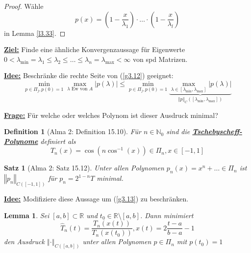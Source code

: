\documentclass{book}
\newtheorem{theorem}[algorithm]{Satz}
\newtheorem{lemma}[algorithm]{Lemma}
\newtheorem{definition}[algorithm]{Definition}
\def\R{\mathbb{R}}
\def\N{\mathbb{N}}
\begin{document}
            \begin{proof}
                Wähle
                \begin{equation*}
                    p(x)=\left(1-\frac{x}{\lambda_1}\right)\cdot \dots \cdot \left(1-\frac{x}{\lambda_l}\right)
                \end{equation*}
                in Lemma \ref{l3.33}.
            \end{proof}

            \underline{\textbf{Ziel:}} Finde eine ähnliche Konvergenzaussage für Eigenwerte $0<\lambda_{\min}=\lambda_1\leq \lambda_2\leq \dots \leq \lambda_n=\lambda_{\max}<\infty$ von spd Matrizen.

            \underline{\textbf{Idee:}} Beschränke die rechte Seite von (\ref{g3.12}) geeignet:
            \begin{equation}\label{g3.13}
                \min_{p\in\Pi_j,p(0)=1}\max_{\lambda \text{ Ew von }A} |p(\lambda)|\leq \min_{p\in\Pi_j,p(0)=1}\underbrace{\max_{\lambda\in [\lambda_{\min},\lambda_{\max}]} |p(\lambda)|}_{\left\Vert p \right\Vert_C([\lambda_{\min},\lambda_{\max}])}                 
            \end{equation}

            \underline{\textbf{Frage:}} Für welche oder welches Polynom ist dieser Ausdruck minimal?
 
            \begin{definition}[Alma 2: Definition 15.10]\label{d3.35}
                Für $n\in\N_0$ sind die \underline{\textbf{Tschebyscheff-Polynome}} definiert als 
                \[T_n(x)=\cos(n\cos^{-1}(x))\in\Pi_n, x\in [-1,1]\]
            \end{definition}

            \begin{theorem}[Alma 2: Satz 15.12]\label{s3.36}
                Unter allen Polynomen $p_n(x)=x^n+ \dots \in \Pi_n$ ist $\left\Vert p_n \right\Vert_{C([-1,1])}$ für $p_n=2^{1-n}T$ minimal.
            \end{theorem}

            \underline{\textbf{Idee:}} Modifiziere diese Aussage um (\ref{g3.13}) zu beschränken.

            \begin{lemma}\label{l3.37}
                Sei $[a,b]\subset \R$ und $t_0\in\R\setminus[a,b]$. Dann minimiert 
                \begin{equation*}
                    \hat{T}_n(t)=\frac{T_n(x(t))}{T_n(x(t_0))},x(t)=2\frac{t-a}{b-a}-1
                \end{equation*}
                den Ausdruck $\left\Vert \cdot \right\Vert_{C([a,b])}$ unter allen Polynomen $p\in\Pi_n$ mit $p(t_0)=1$
            \end{lemma}
\end{document}
